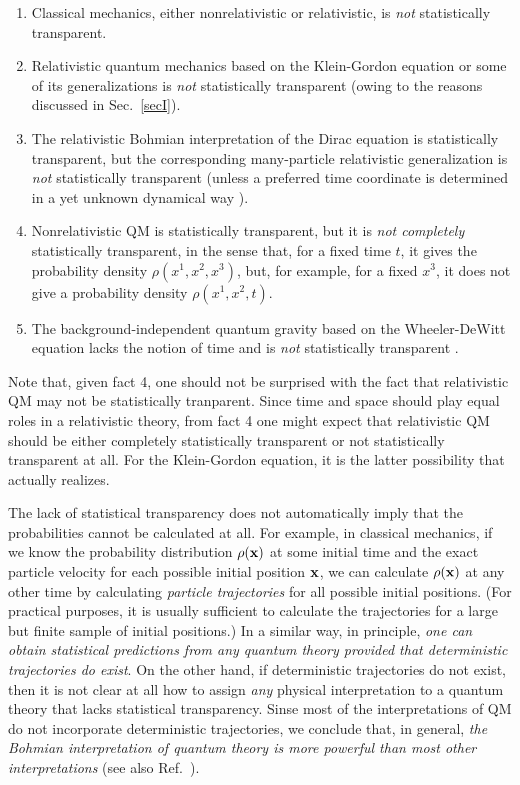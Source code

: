 \documentclass[11pt]{article}
\begin{document}
\begin{enumerate}
%
\item Classical mechanics, either nonrelativistic or relativistic, 
is {\em not} statistically transparent.
%
\item Relativistic quantum mechanics based on the Klein-Gordon 
equation or some of its generalizations is {\em not} 
statistically transparent (owing to the reasons discussed in Sec.~\ref{secI}).
%
\item The relativistic Bohmian interpretation of the
Dirac equation is statistically transparent, 
but the corresponding
many-particle relativistic generalization is {\em not} 
statistically transparent \cite{bern} (unless a preferred time 
coordinate is determined in a yet unknown dynamical way \cite{durr99}).
%
\item Nonrelativistic QM is statistically transparent, 
but it is {\em not completely} statistically transparent, 
in the sense that, for a fixed time $t$, it gives the probability  
density $\rho(x^1,x^2,x^3)$, but, for example, 
for a fixed $x^3$, it does not give a probability  
density $\rho(x^1,x^2,t)$.
%
\item The background-independent quantum gravity based on 
the Wheeler-DeWitt equation lacks the notion of time 
and is {\em not} statistically transparent \cite{kuc,ish}.
\end{enumerate}

Note that, given fact 4, one should not be surprised 
with the fact that relativistic QM may not be statistically tranparent.
Since time and space should play equal roles in a relativistic 
theory, from fact 4 one might expect that 
relativistic QM should be either 
completely statistically transparent or not statistically 
transparent at all. For the Klein-Gordon equation, it is 
the latter possibility that actually realizes.

The lack of statistical transparency does not automatically imply 
that the probabilities cannot be calculated at all. For example, 
in classical mechanics, if we know the probability distribution 
$\rho({\bf x})$ at some initial time and 
the exact particle velocity for each possible initial position 
${\bf x}$, we can calculate $\rho({\bf x})$ at any 
other time by calculating {\em particle trajectories} for all 
possible initial positions. 
(For practical purposes, it is usually sufficient to calculate 
the trajectories for a large but finite sample of initial positions.)
In a similar way, in principle, {\em one can obtain statistical 
predictions from any quantum theory provided that deterministic 
trajectories do exist}. On the other hand, if deterministic 
trajectories do not exist, then it is not clear at all how to assign 
{\em any} physical interpretation to a quantum theory that 
lacks statistical transparency. 
Sinse most of the interpretations 
of QM do not incorporate deterministic trajectories, we conclude 
that, in general, {\em the Bohmian interpretation of quantum theory 
is more powerful than most other interpretations} 
(see also Ref.~\cite{nikoldbb3}).
\end{document}

